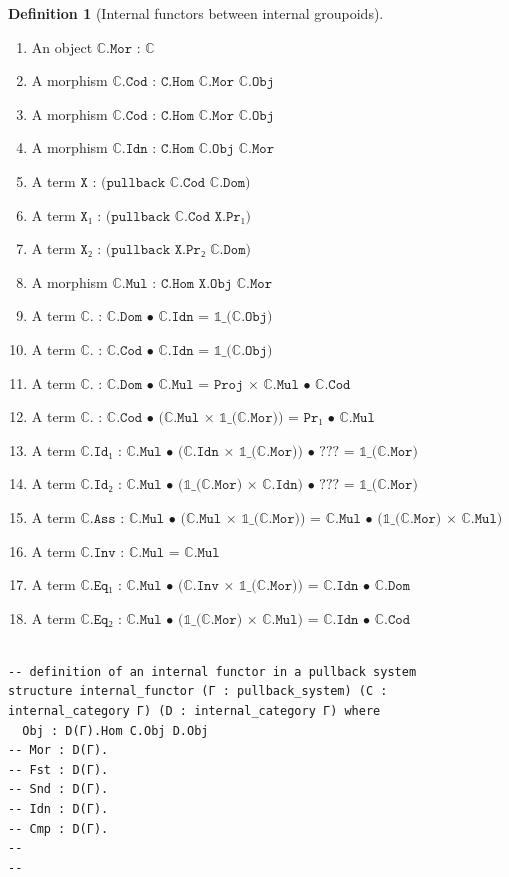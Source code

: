 \documentclass{book}
\theoremstyle{definition}
\newtheorem{definition}{Definition}
\newcounter{lcounter}
\begin{document}
\begin{definition}[Internal functors between internal groupoids] 
\begin{enumerate}
\item An object $\texttt{ℂ.Mor : ℂ}$ 
\item A morphism $\texttt{ℂ.Cod : C.Hom ℂ.Mor ℂ.Obj}$
\item A morphism $\texttt{ℂ.Cod : C.Hom ℂ.Mor ℂ.Obj}$
\item A morphism $\texttt{ℂ.Idn : C.Hom ℂ.Obj ℂ.Mor}$
\item A term $\texttt{X : (pullback ℂ.Cod ℂ.Dom)}$
\item A term $\texttt{X₁ : (pullback ℂ.Cod X.Pr₁)}$
\item A term $\texttt{X₂ : (pullback X.Pr₂ ℂ.Dom)}$
\item A morphism $\texttt{ℂ.Mul : C.Hom X.Obj ℂ.Mor}$
\item A term $\texttt{ℂ. : ℂ.Dom • ℂ.Idn = 𝟙\_(ℂ.Obj)}$
\item A term $\texttt{ℂ. : ℂ.Cod • ℂ.Idn = 𝟙\_(ℂ.Obj)}$
\item A term $\texttt{ℂ. : ℂ.Dom • ℂ.Mul =  Proj × ℂ.Mul • ℂ.Cod}$
\item A term $\texttt{ℂ. : ℂ.Cod • (ℂ.Mul × 𝟙\_(ℂ.Mor)) = Pr₁ • ℂ.Mul}$
\item A term $\texttt{ℂ.Id₁ : ℂ.Mul • (ℂ.Idn × 𝟙\_(ℂ.Mor)) • ??? = 𝟙\_(ℂ.Mor)}$
\item A term $\texttt{ℂ.Id₂ : ℂ.Mul • (𝟙\_(ℂ.Mor) × ℂ.Idn) • ??? = 𝟙\_(ℂ.Mor)}$
\item A term $\texttt{ℂ.Ass : ℂ.Mul • (ℂ.Mul × 𝟙\_(ℂ.Mor)) = ℂ.Mul • (𝟙\_(ℂ.Mor) × ℂ.Mul)}$
\item A term $\texttt{ℂ.Inv : ℂ.Mul = ℂ.Mul}$
\item A term $\texttt{ℂ.Eq₁ : ℂ.Mul • (ℂ.Inv × 𝟙\_(ℂ.Mor)) = ℂ.Idn • ℂ.Dom}$
\item A term $\texttt{ℂ.Eq₂ : ℂ.Mul • (𝟙\_(ℂ.Mor) × ℂ.Mul) = ℂ.Idn • ℂ.Cod}$
\end{enumerate}
\end{definition}

\begin{center}
\begin{tcolorbox}[width=5in,colback={white},title={\begin{center}\texttt{Lean \thelcounter} \addtocounter{lcounter}{1}  \end{center}},colbacktitle=Blue,coltitle=black]
\begin{verbatim}

-- definition of an internal functor in a pullback system
structure internal_functor (Γ : pullback_system) (C : internal_category Γ) (D : internal_category Γ) where
  Obj : D(Γ).Hom C.Obj D.Obj
-- Mor : D(Γ).
-- Fst : D(Γ).
-- Snd : D(Γ).
-- Idn : D(Γ).
-- Cmp : D(Γ).
--
--


\end{verbatim}
\end{tcolorbox}
\end{center}
\end{document}
